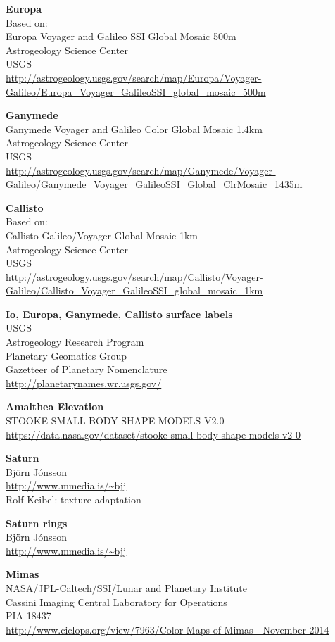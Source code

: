 \documentclass[Orbiter User Manual.tex]{subfiles}
\begin{document}
\textbf{Europa}\\
Based on:\\
Europa Voyager and Galileo SSI Global Mosaic 500m\\
Astrogeology Science Center\\
USGS\\
\url{http://astrogeology.usgs.gov/search/map/Europa/Voyager-Galileo/Europa_Voyager_GalileoSSI_global_mosaic_500m}

\textbf{Ganymede}\\
Ganymede Voyager and Galileo Color Global Mosaic 1.4km\\
Astrogeology Science Center\\
USGS\\
\url{http://astrogeology.usgs.gov/search/map/Ganymede/Voyager-Galileo/Ganymede_Voyager_GalileoSSI_Global_ClrMosaic_1435m}

\textbf{Callisto}\\
Based on:\\
Callisto Galileo/Voyager Global Mosaic 1km\\
Astrogeology Science Center\\
USGS\\
\url{http://astrogeology.usgs.gov/search/map/Callisto/Voyager-Galileo/Callisto_Voyager_GalileoSSI_global_mosaic_1km}

\textbf{Io, Europa, Ganymede, Callisto surface labels}\\
USGS\\
Astrogeology Research Program\\
Planetary Geomatics Group\\
Gazetteer of Planetary Nomenclature\\
\url{http://planetarynames.wr.usgs.gov/}

\textbf{Amalthea Elevation}\\
STOOKE SMALL BODY SHAPE MODELS V2.0 \\
\url{https://data.nasa.gov/dataset/stooke-small-body-shape-models-v2-0}

\textbf{Saturn}\\
Björn Jónsson\\
\url{http://www.mmedia.is/~bjj}\\
Rolf Keibel: texture adaptation

\textbf{Saturn rings}\\
Björn Jónsson\\
\url{http://www.mmedia.is/~bjj}

\textbf{Mimas}\\
NASA/JPL-Caltech/SSI/Lunar and Planetary Institute\\
Cassini Imaging Central Laboratory for Operations\\
PIA 18437\\
\url{http://www.ciclops.org/view/7963/Color-Maps-of-Mimas---November-2014}
\end{document}
